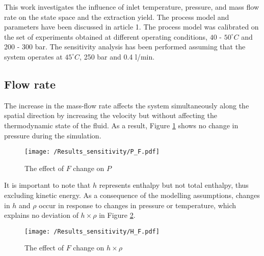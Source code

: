 \documentclass[../Article_Design_of_Experiment.tex]{subfiles}
\begin{document}
	
	\label{CH: Results}
	
	This work investigates the influence of inlet temperature, pressure, and mass flow rate on the state space and the extraction yield. The process model and parameters have been discussed in {\color{red}article 1}. The process model was calibrated on the set of experiments obtained at different operating conditions, $40$ - $50^\circ C$ and 200 - 300 bar. The sensitivity analysis has been performed assuming that the system operates at $45^\circ C$, 250 bar and 0.4 l/min.
	
	\subsection{Flow rate}
	
	The increase in the mass-flow rate affects the system simultaneously along the spatial direction by increasing the velocity but without affecting the thermodynamic state of the fluid. As a result, Figure \ref{fig:Sensitivty_F_P} shows no change in pressure during the simulation.
	
	\begin{figure}[h!]
		\centering
		\texttt{[image: /Results\_sensitivity/P\_F.pdf]}
		\caption{The effect of $F$ change on $P$}
		\label{fig:Sensitivty_F_P}
	\end{figure}
	
	It is important to note that $h$ represents enthalpy but not total enthalpy, thus excluding kinetic energy. As a consequence of the modelling assumptions, changes in $h$ and $\rho$ occur in response to changes in pressure or temperature, which explains no deviation of $h \times \rho$ in Figure \ref{fig:Sensitivty_F_H}.
    
        
    \begin{figure}[h!]
    	\centering
    	\texttt{[image: /Results\_sensitivity/H\_F.pdf]}
    	\caption{The effect of $F$ change on $h \times \rho$}
    	\label{fig:Sensitivty_F_H}
    \end{figure}
   
\end{document}
